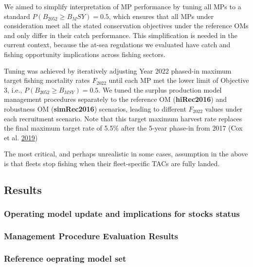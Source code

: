 \documentclass[11pt]{book}
\begin{document}
We aimed to simplify interpretation of MP performance by tuning all MPs to a standard \(P(B_{2052} \geq B_MSY) = 0.5\), which ensures that all MPs under consideration meet all the stated conservation objectives under the reference OMs and only differ in their catch performance. This simplification is needed in the current context, because the at-sea regulations we evaluated have catch and fishing opportunity implications across fishing sectors.

Tuning was achieved by iteratively adjusting Year 2022 phased-in maximum target fishing mortality rates \(F_{2022}\) until each MP met the lower limit of Objective 3, i.e., \(P(B_{2052} \geq B_{MSY}) = 0.5\). We tuned the surplus production model management procedures separately to the reference OM (\textbf{hiRec2016}) and robustness OM (\textbf{simRec2016}) scenarios, leading to different \(F_{2022}\) values under each recruitment scenario. Note that this target maximum harvest rate replaces the final maximum target rate of 5.5\% after the 5-year phase-in from 2017 (Cox et al. \protect\hyperlink{ref-cox2019evaluating}{2019})

The most critical, and perhaps unrealistic in some cases, assumption in the above is that fleets stop fishing when their fleet-specific TACs are fully landed.

\hypertarget{results}{%
\subsection{Results}\label{results}}

\hypertarget{operating-model-update-and-implications-for-stocks-status}{%
\subsubsection{Operating model update and implications for stocks status}\label{operating-model-update-and-implications-for-stocks-status}}

\hypertarget{management-procedure-evaluation-results}{%
\subsubsection{Management Procedure Evaluation Results}\label{management-procedure-evaluation-results}}

\hypertarget{reference-oeprating-model-set}{%
\subsubsection{Reference oeprating model set}\label{reference-oeprating-model-set}}
\end{document}
